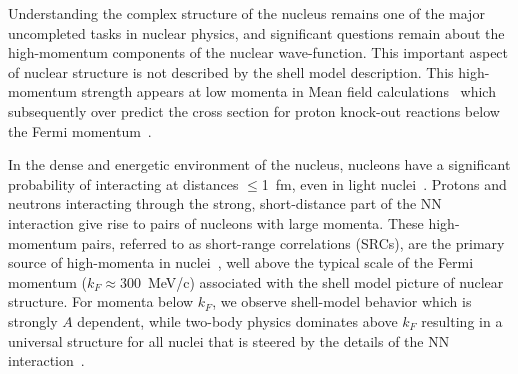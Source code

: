 
Understanding the complex structure of the nucleus remains one of the major uncompleted tasks in nuclear physics, and significant questions remain about the high-momentum components of the nuclear wave-function. This important aspect of nuclear structure is not described by the shell model description. This high-momentum strength appears at low momenta in Mean field calculations~\cite{DeForest1983} which subsequently over predict the cross section for proton knock-out reactions below the Fermi momentum~\cite{VanDerSteenhoven1988547, Lapikas1993297, Kelly:1996hd}.



In the dense and energetic environment of the nucleus, nucleons have a significant probability of
interacting at distances $\le$1~fm, even in light nuclei~\cite{carlson14,lu13}. Protons and neutrons
interacting through the strong, short-distance part of the NN interaction give rise to pairs of
nucleons with large momenta. These high-momentum pairs, referred to as short-range correlations (SRCs), are
the primary source of high-momenta in nuclei~\cite{Frankfurt1981215, SLAC_Measurement_PRC.48.2451,
src_john}, well above the typical scale of the Fermi momentum ($k_F \approx 300$~MeV/c) associated with the
shell model picture of nuclear structure. For momenta below $k_F$, we observe shell-model behavior which is
strongly $A$ dependent, while two-body physics dominates above $k_F$ resulting in a universal
structure for all nuclei that is steered by the details of the NN interaction~\cite{RevModPhys.80.189,
PhysRevC.53.1689, wiringa14}.

